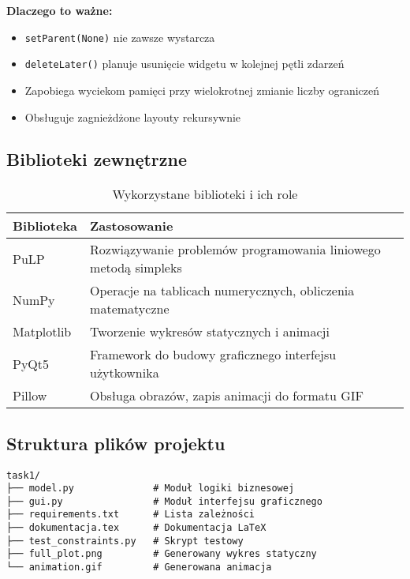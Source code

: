 \documentclass[12pt,a4paper]{article}
\begin{document}
\begin{enumerate}
\textbf{Dlaczego to ważne:}
\begin{itemize}
    \item \texttt{setParent(None)} nie zawsze wystarcza
    \item \texttt{deleteLater()} planuje usunięcie widgetu w kolejnej pętli zdarzeń
    \item Zapobiega wyciekom pamięci przy wielokrotnej zmianie liczby ograniczeń
    \item Obsługuje zagnieżdżone layouty rekursywnie
\end{itemize}

\subsection{Biblioteki zewnętrzne}

\begin{table}[H]
\centering
\begin{tabular}{|l|p{10cm}|}
\hline
\textbf{Biblioteka} & \textbf{Zastosowanie} \\ \hline
PuLP & Rozwiązywanie problemów programowania liniowego metodą simpleks \\ \hline
NumPy & Operacje na tablicach numerycznych, obliczenia matematyczne \\ \hline
Matplotlib & Tworzenie wykresów statycznych i animacji \\ \hline
PyQt5 & Framework do budowy graficznego interfejsu użytkownika \\ \hline
Pillow & Obsługa obrazów, zapis animacji do formatu GIF \\ \hline
\end{tabular}
\caption{Wykorzystane biblioteki i ich role}
\end{table}

\subsection{Struktura plików projektu}

\begin{verbatim}
task1/
├── model.py              # Moduł logiki biznesowej
├── gui.py                # Moduł interfejsu graficznego
├── requirements.txt      # Lista zależności
├── dokumentacja.tex      # Dokumentacja LaTeX
├── test_constraints.py   # Skrypt testowy
├── full_plot.png         # Generowany wykres statyczny
└── animation.gif         # Generowana animacja
\end{verbatim}


\end{enumerate}
\end{document}
